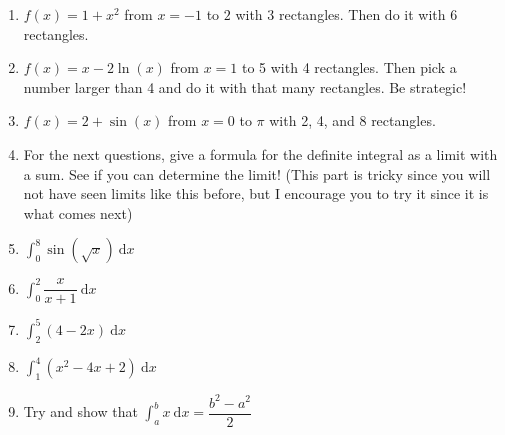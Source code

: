 \documentclass[10pt]{article}
\newcommand{\dx}{\:\mathrm{d}x}
\theoremstyle{Theorem}
\theoremstyle{definition}
\theoremstyle{remark}
\theoremstyle{custom}
\begin{document}
\begin{enumerate}[1.]
\item $f(x)=1+x^2$ from $x=-1$ to $2$ with 3 rectangles. Then do it with 6 rectangles.
\item $f(x)=x-2\ln(x)$ from $x=1$ to 5 with 4 rectangles. Then pick a number larger than 4 and do it with that many rectangles. Be strategic!
\item $f(x)=2+\sin(x)$ from $x=0$ to $\pi$ with 2, 4, and 8 rectangles.
\item For the next questions, give a formula for the definite integral as a limit with a sum. See if you can determine the limit! (This part is tricky since you will not have seen limits like this before, but I encourage you to try it since it is what comes next)
\item $\int_0^8\sin(\sqrt{x})\dx$ 
\item $\int_0^2 \dfrac{x}{x+1}\dx$
\item $\int_2^5(4-2x)\dx$
\item $\int_1^4(x^2-4x+2)\dx$
\item Try and show that $\int_a^b x\dx = \dfrac{b^2-a^2}{2}$
\end{enumerate}
\end{document}
